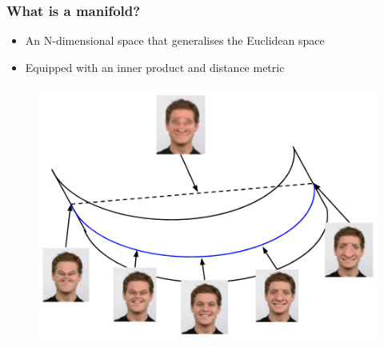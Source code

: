 \documentclass[10pt,xcolor=table]{beamer}
\begin{document}
\begin{frame}
\frametitle{What is a manifold?}

\begin{itemize}
 \item An N-dimensional space that generalises the Euclidean space
 \item Equipped with an inner product and distance metric
\end{itemize}

\vspace{-0.5cm}
\begin{figure}
\includegraphics[scale=0.28]{manifold_faces_diagram.png}
\end{figure}
\vspace{-0.5cm}

\end{frame}
\end{document}
